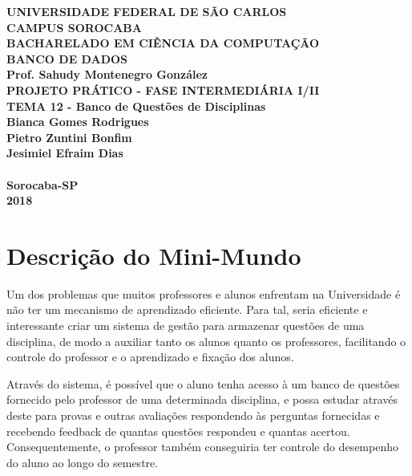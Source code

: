 \documentclass[12pt,a4paper]{article}
\begin{document}
\begin{titlepage}

\begin{center}

\textbf{UNIVERSIDADE FEDERAL DE SÃO CARLOS\\CAMPUS SOROCABA\\\vspace{3cm} BACHARELADO EM CIÊNCIA DA COMPUTAÇÃO\\\vspace{3cm}BANCO DE DADOS\\
Prof. Sahudy Montenegro González\\\vspace{3cm}
PROJETO PRÁTICO - FASE INTERMEDIÁRIA I/II\\\vspace{0.5cm}
TEMA 12 - Banco de Questões de Disciplinas\\\vspace{4.0cm}
Bianca Gomes Rodrigues\\
Pietro Zuntini Bonfim\\
Jesimiel Efraim Dias\\
\\\vspace{4cm}
Sorocaba-SP\\2018}

\end{center}

\end{titlepage}

\pagebreak
\renewcommand*\contentsname{Índice}
\tableofcontents
\pagebreak

\section{Descrição do Mini-Mundo}

Um dos problemas que muitos professores e alunos enfrentam na Universidade é não ter um mecanismo de aprendizado eficiente. Para tal, seria eficiente e interessante criar um sistema de gestão para armazenar questões de uma disciplina, de modo a auxiliar tanto os alunos quanto os professores, facilitando o controle do professor e o aprendizado e fixação dos alunos.\par
Através do sistema, é possível que o aluno tenha acesso à um banco de questões fornecido pelo professor de uma determinada disciplina, e possa estudar através deste para provas e outras avaliações respondendo às perguntas fornecidas e recebendo feedback de quantas questões respondeu e quantas acertou. Consequentemente, o professor também conseguiria ter controle do desempenho do aluno ao longo do semestre.\par
\end{document}
